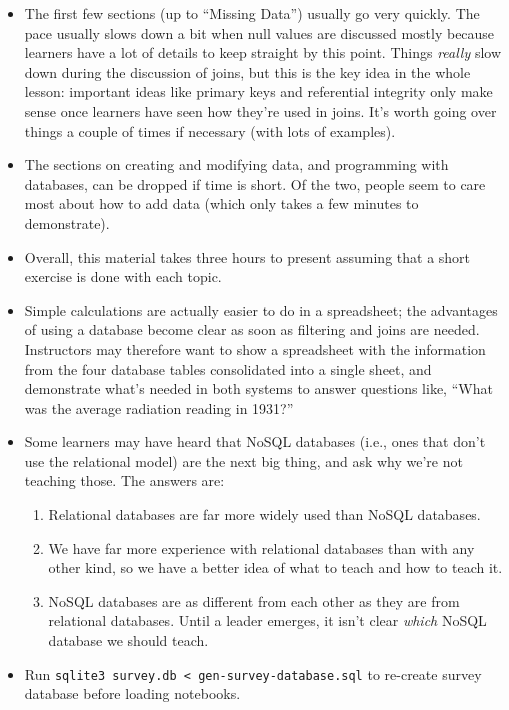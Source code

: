\documentclass[]{book}
\begin{document}
\begin{itemize}
\item
  The first few sections (up to ``Missing Data'') usually go very
  quickly. The pace usually slows down a bit when null values are
  discussed mostly because learners have a lot of details to keep
  straight by this point. Things \emph{really} slow down during the
  discussion of joins, but this is the key idea in the whole lesson:
  important ideas like primary keys and referential integrity only make
  sense once learners have seen how they're used in joins. It's worth
  going over things a couple of times if necessary (with lots of
  examples).
\item
  The sections on creating and modifying data, and programming with
  databases, can be dropped if time is short. Of the two, people seem to
  care most about how to add data (which only takes a few minutes to
  demonstrate).
\item
  Overall, this material takes three hours to present assuming that a
  short exercise is done with each topic.
\item
  Simple calculations are actually easier to do in a spreadsheet; the
  advantages of using a database become clear as soon as filtering and
  joins are needed. Instructors may therefore want to show a spreadsheet
  with the information from the four database tables consolidated into a
  single sheet, and demonstrate what's needed in both systems to answer
  questions like, ``What was the average radiation reading in 1931?''
\item
  Some learners may have heard that NoSQL databases (i.e., ones that
  don't use the relational model) are the next big thing, and ask why
  we're not teaching those. The answers are:

  \begin{enumerate}
  \item
    Relational databases are far more widely used than NoSQL databases.
  \item
    We have far more experience with relational databases than with any
    other kind, so we have a better idea of what to teach and how to
    teach it.
  \item
    NoSQL databases are as different from each other as they are from
    relational databases. Until a leader emerges, it isn't clear
    \emph{which} NoSQL database we should teach.
  \end{enumerate}
\item
  Run \texttt{sqlite3 survey.db \textless{} gen-survey-database.sql} to
  re-create survey database before loading notebooks.
\end{itemize}
\end{document}
